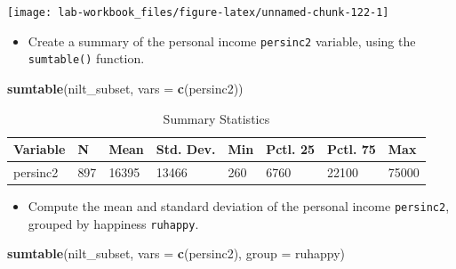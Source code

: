 \documentclass[
]{book}
\newenvironment{Shaded}{\begin{snugshade}}{\end{snugshade}}
\newcommand{\AttributeTok}[1]{\textcolor[rgb]{0.13,0.29,0.53}{#1}}
\newcommand{\FunctionTok}[1]{\textcolor[rgb]{0.13,0.29,0.53}{\textbf{#1}}}
\newcommand{\NormalTok}[1]{#1}
\newcommand{\SpecialCharTok}[1]{\textcolor[rgb]{0.81,0.36,0.00}{\textbf{#1}}}
\newcommand{\StringTok}[1]{\textcolor[rgb]{0.31,0.60,0.02}{#1}}
\providecommand{\tightlist}{%
  \setlength{\itemsep}{0pt}\setlength{\parskip}{0pt}}
\begin{document}
\begin{Shaded}
\end{Shaded}

\begin{flushleft}\texttt{[image: lab-workbook\_files/figure-latex/unnamed-chunk-122-1]} \end{flushleft}

\begin{itemize}
\tightlist
\item
  Create a summary of the personal income \texttt{persinc2} variable, using the \texttt{sumtable()} function.
\end{itemize}

\begin{Shaded}
\begin{Highlighting}[]
\FunctionTok{sumtable}\NormalTok{(nilt\_subset, }\AttributeTok{vars =} \FunctionTok{c}\NormalTok{(}\StringTok{\textquotesingle{}persinc2\textquotesingle{}}\NormalTok{))}
\end{Highlighting}
\end{Shaded}

\begin{table}

\caption{\label{tab:unnamed-chunk-123}Summary Statistics}
\centering
\begin{tabular}[t]{llllllll}
\toprule
Variable & N & Mean & Std. Dev. & Min & Pctl. 25 & Pctl. 75 & Max\\
\midrule
persinc2 & 897 & 16395 & 13466 & 260 & 6760 & 22100 & 75000\\
\bottomrule
\end{tabular}
\end{table}

\begin{itemize}
\tightlist
\item
  Compute the mean and standard deviation of the personal income \texttt{persinc2}, grouped by happiness \texttt{ruhappy}.
\end{itemize}

\begin{Shaded}
\begin{Highlighting}[]
\FunctionTok{sumtable}\NormalTok{(nilt\_subset, }\AttributeTok{vars =} \FunctionTok{c}\NormalTok{(}\StringTok{\textquotesingle{}persinc2\textquotesingle{}}\NormalTok{), }\AttributeTok{group =} \StringTok{\textquotesingle{}ruhappy\textquotesingle{}}\NormalTok{)}
\end{Highlighting}
\end{Shaded}
\end{document}
